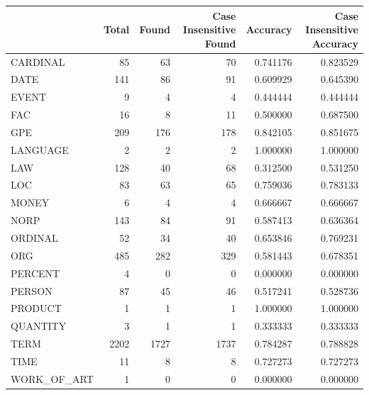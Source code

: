 \begin{tabular}{lrrrrr}
\toprule
 & Total & Found & Case Insensitive Found & Accuracy & Case Insensitive Accuracy \\
\midrule
CARDINAL & 85 & 63 & 70 & 0.741176 & 0.823529 \\
DATE & 141 & 86 & 91 & 0.609929 & 0.645390 \\
EVENT & 9 & 4 & 4 & 0.444444 & 0.444444 \\
FAC & 16 & 8 & 11 & 0.500000 & 0.687500 \\
GPE & 209 & 176 & 178 & 0.842105 & 0.851675 \\
LANGUAGE & 2 & 2 & 2 & 1.000000 & 1.000000 \\
LAW & 128 & 40 & 68 & 0.312500 & 0.531250 \\
LOC & 83 & 63 & 65 & 0.759036 & 0.783133 \\
MONEY & 6 & 4 & 4 & 0.666667 & 0.666667 \\
NORP & 143 & 84 & 91 & 0.587413 & 0.636364 \\
ORDINAL & 52 & 34 & 40 & 0.653846 & 0.769231 \\
ORG & 485 & 282 & 329 & 0.581443 & 0.678351 \\
PERCENT & 4 & 0 & 0 & 0.000000 & 0.000000 \\
PERSON & 87 & 45 & 46 & 0.517241 & 0.528736 \\
PRODUCT & 1 & 1 & 1 & 1.000000 & 1.000000 \\
QUANTITY & 3 & 1 & 1 & 0.333333 & 0.333333 \\
TERM & 2202 & 1727 & 1737 & 0.784287 & 0.788828 \\
TIME & 11 & 8 & 8 & 0.727273 & 0.727273 \\
WORK_OF_ART & 1 & 0 & 0 & 0.000000 & 0.000000 \\
\bottomrule
\end{tabular}
